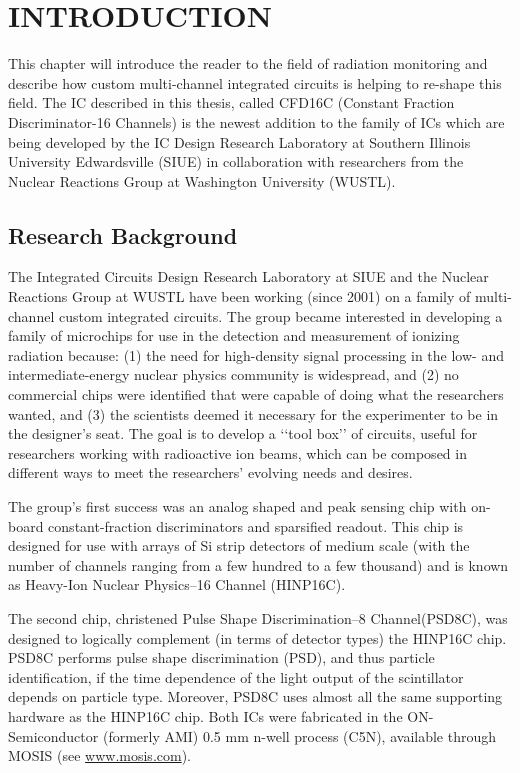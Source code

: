 \documentclass[12pt,oneside,final]{siuethesis}
\theoremstyle{definition}
\begin{document}
\chapter{INTRODUCTION}  %

This chapter will introduce the reader to the field of radiation monitoring and describe how custom multi-channel integrated circuits is helping to re-shape this field.  The IC described in this thesis, called CFD16C (Constant Fraction Discriminator-16 Channels) is the newest addition to the family of ICs which are being developed by the IC Design Research Laboratory at Southern Illinois University Edwardsville (SIUE) in collaboration with researchers from the Nuclear Reactions Group at Washington University (WUSTL).

\section{Research Background}

The Integrated Circuits Design Research Laboratory at SIUE and the Nuclear Reactions Group at WUSTL have been working (since 2001) on a family of multi-channel custom integrated circuits.  The group became interested in developing a family of microchips for use in the detection and measurement of ionizing radiation because: (1) the need for high-density signal processing in the low- and intermediate-energy nuclear physics community is widespread, and (2) no commercial chips were identified that were capable of doing what the researchers wanted, and (3) the scientists deemed it necessary for the experimenter to be in the designer's seat. The goal is to develop a ‘‘tool box’’ of circuits,
useful for researchers working with radioactive ion beams, which can be composed in different ways to meet the researchers' evolving needs and desires.

 
The group's first success was an analog shaped and peak sensing chip with on-board constant-fraction discriminators and
sparsified readout. This chip is designed for use with arrays of Si strip detectors of medium scale (with the number of channels ranging from a few hundred to a few thousand) and is known as Heavy-Ion Nuclear Physics–16 Channel (HINP16C). 

The second chip, christened Pulse Shape Discrimination–8 Channel(PSD8C), was designed to logically complement (in terms of detector types) the HINP16C chip. PSD8C performs pulse shape discrimination (PSD), and thus particle identification, if the time dependence of the light output of the scintillator depends on particle type. Moreover, PSD8C uses almost all the same supporting hardware as the HINP16C chip. Both ICs were fabricated in the ON-Semiconductor (formerly AMI) 0.5 mm n-well process (C5N), available through MOSIS (see \url{www.mosis.com}).
\end{document}
